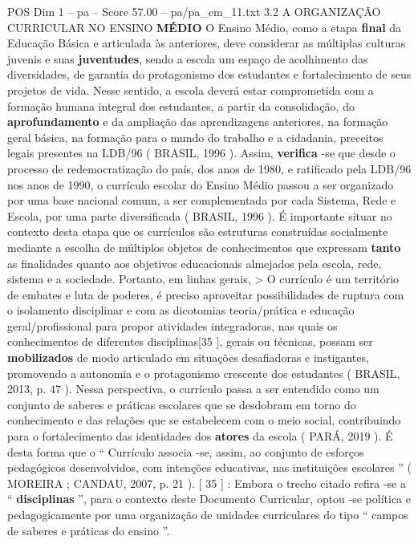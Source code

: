 \begin{textsample}{POS Dim 1 – pa – Score 57.00 – pa/pa\_em\_11.txt}  \label{ex:f1_pos_038}
3.2 A ORGANIZAÇÃO CURRICULAR NO ENSINO \textbf{MÉDIO} O Ensino Médio, como a etapa \textbf{final} da Educação Básica e articulada às anteriores, deve considerar as múltiplas culturas juvenis e suas \textbf{juventudes}, sendo a escola um espaço de acolhimento das diversidades, de garantia do protagonismo dos estudantes e fortalecimento de seus projetos de vida.
Nesse sentido, a escola deverá estar comprometida com a formação humana integral dos estudantes, a partir da consolidação, do \textbf{aprofundamento} e da ampliação das aprendizagens anteriores, na formação geral básica, na formação para o mundo do trabalho e a cidadania, preceitos legais presentes na LDB/96 ( BRASIL, 1996 ).
Assim, \textbf{verifica} -se que desde o processo de redemocratização do país, dos anos de 1980, e ratificado pela LDB/96 nos anos de 1990, o currículo escolar do Ensino Médio passou a ser organizado por uma base nacional comum, a ser complementada por cada Sistema, Rede e Escola, por uma parte diversificada ( BRASIL, 1996 ).
É importante situar no contexto desta etapa que os currículos são estruturas construídas socialmente mediante a escolha de múltiplos objetos de conhecimentos que expressam \textbf{tanto} as finalidades quanto aos objetivos educacionais almejados pela escola, rede, sistema e a sociedade.
Portanto, em linhas gerais, > O currículo é um território de embates e luta de poderes, é preciso aproveitar possibilidades de ruptura com o isolamento disciplinar e com as dicotomias teoria/prática e educação geral/profissional para propor atividades integradoras, nas quais os conhecimentos de diferentes disciplinas[35 ], gerais ou técnicas, possam ser \textbf{mobilizados} de modo articulado em situações desafiadoras e instigantes, promovendo a autonomia e o protagonismo crescente dos estudantes ( BRASIL, 2013, p. 47 ).
Nessa perspectiva, o currículo passa a ser entendido como um conjunto de saberes e práticas escolares que se desdobram em torno do conhecimento e das relações que se estabelecem com o meio social, contribuindo para o fortalecimento das identidades dos \textbf{atores} da escola ( PARÁ, 2019 ).
É desta forma que o “ Currículo associa -se, assim, ao conjunto de esforços pedagógicos desenvolvidos, com intenções educativas, nas instituições escolares ” ( MOREIRA ; CANDAU, 2007, p. 21 ). [ 35 ] : Embora o trecho citado refira -se a “ \textbf{disciplinas} ”, para o contexto deste Documento Curricular, optou -se política e pedagogicamente por uma organização de unidades curriculares do tipo “ campos de saberes e práticas do ensino ”.

\end{textsample}
